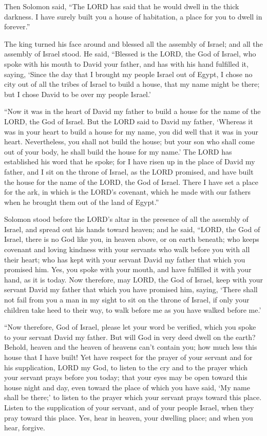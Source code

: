 \myverse{}Then Solomon said, “The LORD has said that he would dwell in
the thick darkness.
\myverse{}I have surely built you a house of habitation, a place for you to dwell in
forever.”

\myverse{}The king turned his face around and blessed all the assembly
of Israel; and all the assembly of Israel stood.
\myverse{}He said, “Blessed is the LORD, the God of Israel, who spoke with his mouth
to David your father, and has with his hand fulfilled it, saying,
\myverse{}‘Since the day that I brought my people Israel out of Egypt, I chose no city
out of all the tribes of Israel to build a house, that my name might be there; but I chose David to be
over my people Israel.’

\myverse{}“Now it was in the heart of David my father to build a house
for the name of the LORD, the God of Israel.
\myverse{}But the LORD said to David my father, ‘Whereas it was in your heart to build
a house for my name, you did well that it was in your heart.
\myverse{}Nevertheless, you shall not build the house; but your son who shall come out
of your body, he shall build the house for my name.’
\myverse{}The LORD has established his word that he spoke; for I have risen up in the
place of David my father, and I sit on the throne of Israel, as the LORD promised, and have built the
house for the name of the LORD, the God of Israel.
\myverse{}There I have set a place for the ark, in which is the LORD’s covenant, which
he made with our fathers when he brought them out of the land of Egypt.”

\myverse{}Solomon stood before the LORD’s altar in the presence of all
the assembly of Israel, and spread out his hands toward heaven;
\myverse{}and he said, “LORD, the God of Israel, there is no God like you, in heaven
above, or on earth beneath; who keeps covenant and loving kindness with your servants who walk before
you with all their heart;
\myverse{}who has kept with your servant David my father that which you promised him.
Yes, you spoke with your mouth, and have fulfilled it with your hand, as it is today.
\myverse{}Now therefore, may LORD, the God of Israel, keep with your servant David my
father that which you have promised him, saying, ‘There shall not fail from you a man in my sight to sit
on the throne of Israel, if only your children take heed to their way, to walk before me as you have walked
before me.’

\myverse{}“Now therefore, God of Israel, please let your word be verified,
which you spoke to your servant David my father.
\myverse{}But will God in very deed dwell on the earth? Behold, heaven and the heaven
of heavens can’t contain you; how much less this house that I have built!
\myverse{}Yet have respect for the prayer of your servant and for his supplication,
LORD my God, to listen to the cry and to the prayer which your servant prays before you today;
\myverse{}that your eyes may be open toward this house night and day, even toward the
place of which you have said, ‘My name shall be there;’ to listen to the prayer which your servant prays
toward this place.
\myverse{}Listen to the supplication of your servant, and of your people Israel, when
they pray toward this place. Yes, hear in heaven, your dwelling place; and when you hear, forgive.

